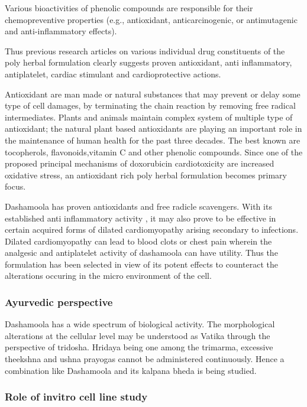 \documentclass[11pt]{article} %
\begin{document}
Various bioactivities of phenolic compounds are responsible for their chemopreventive
properties (e.g., antioxidant, anticarcinogenic, or antimutagenic and anti-inflammatory
effects). \cite{Mahadevan2016}

Thus previous research articles on various individual drug constituents of the poly herbal
formulation clearly suggests proven antioxidant, anti inflammatory, antiplatelet, cardiac
stimulant and cardioprotective actions.\cite{Malviya2012,Kurian2009,Pathala2015,Chhatre2014}

Antioxidant are man made or natural substances that may prevent or delay some type of cell
damages, by terminating the chain reaction by removing free radical intermediates. Plants and
animals maintain complex system of multiple type of antioxidant; the natural plant based
antioxidants are playing an important role in the maintenance of human health for the past three decades. The best known are tocopherols, flavonoids,vitamin C and other phenolic compounds. Since one of the proposed principal mechanisms of doxorubicin cardiotoxicity are increased oxidative stress, an antioxidant rich poly herbal formulation becomes primary focus.

Dashamoola has proven antioxidants and free radicle scavengers. With its established anti
inflammatory activity , it may also prove to be effective in certain acquired forms of dilated
cardiomyopathy arising secondary to infections. Dilated cardiomyopathy can lead to blood clots
or chest pain wherein the analgesic and antiplatelet activity of dashamoola can have utility.
Thus the formulation has been selected in view of its potent effects to counteract the alterations occuring in the micro environment of the cell.

\subsubsection{Ayurvedic perspective}
\label{subsubsec:Ayurvedic perspective}

Dashamoola has a wide spectrum of biological activity. The morphological alterations at the
cellular level may be understood as Vatika through the perspective of tridosha. Hridaya being
one among the trimarma, excessive theekshna and ushna prayogas cannot be administered
continuously. Hence a combination like Dashamoola and its kalpana bheda is being studied.

\subsubsection{Role of invitro cell line study}
\label{subsubsec:Role of invitro cell line study}
\end{document}
